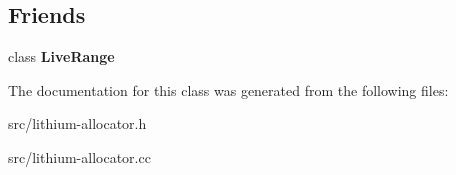 \subsection*{Friends}
\begin{DoxyCompactItemize}
\item 
\hypertarget{classv8_1_1internal_1_1_use_interval_a05b53ec81357069e15d5d0e582589f6a}{}class {\bfseries Live\+Range}\label{classv8_1_1internal_1_1_use_interval_a05b53ec81357069e15d5d0e582589f6a}

\end{DoxyCompactItemize}


The documentation for this class was generated from the following files\+:\begin{DoxyCompactItemize}
\item 
src/lithium-\/allocator.\+h\item 
src/lithium-\/allocator.\+cc\end{DoxyCompactItemize}

